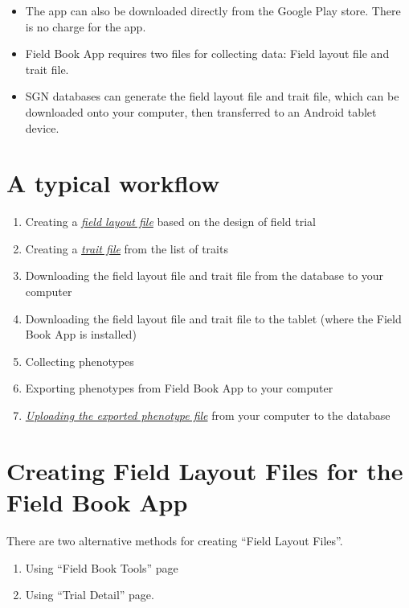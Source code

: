 \documentclass[
  12pt,
]{book}
\begin{document}
\begin{itemize}
\item
  The app can also be downloaded directly from the Google Play store. There is no charge for the app.
\item
  Field Book App requires two files for collecting data: Field layout file and trait file.
\item
  SGN databases can generate the field layout file and trait file, which can be downloaded onto your computer, then transferred to an Android tablet device.
\end{itemize}

\hypertarget{a-typical-workflow}{%
\section{A typical workflow}\label{a-typical-workflow}}

\begin{enumerate}
\def\labelenumi{\arabic{enumi}.}
\item
  Creating a \protect\hyperlink{creating-layout-files}{\emph{field layout file}} based on the design of field trial
\item
  Creating a \protect\hyperlink{creating-trait-files}{\emph{trait file}} from the list of traits
\item
  Downloading the field layout file and trait file from the database to your computer
\item
  Downloading the field layout file and trait file to the tablet (where the Field Book App is installed)
\item
  Collecting phenotypes
\item
  Exporting phenotypes from Field Book App to your computer
\item
  \protect\hyperlink{uploading-pheno-files}{\emph{Uploading the exported phenotype file}} from your computer to the database
\end{enumerate}

\hypertarget{creating-layout-files}{%
\section{Creating Field Layout Files for the Field Book App}\label{creating-layout-files}}

There are two alternative methods for creating ``Field Layout Files''.

\begin{enumerate}
\def\labelenumi{\arabic{enumi}.}
\item
  Using ``Field Book Tools'' page
\item
  Using ``Trial Detail'' page.
\end{enumerate}
\end{document}
